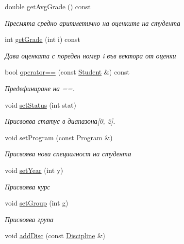 \begin{DoxyCompactItemize}
double \hyperlink{class_student_a44846b4e61b3424f590b3eae4d0c58b0}{get\+Avg\+Grade} () const
\begin{DoxyCompactList}\small\item\em Пресмята средно аритметично на оценките на студента \end{DoxyCompactList}\item 
int \hyperlink{class_student_a8dca8d440345a65b65da10319ecdf50b}{get\+Grade} (int i) const
\begin{DoxyCompactList}\small\item\em Дава оценката с пореден номер i във вектора от оценки \end{DoxyCompactList}\item 
bool \hyperlink{class_student_abb6d4d284794dfd4af8277c5dacc3911}{operator==} (const \hyperlink{class_student}{Student} \&) const
\begin{DoxyCompactList}\small\item\em Предефиниране на ==. \end{DoxyCompactList}\item 
void \hyperlink{class_student_a2d6d1de16bb99c7678f2ef8004928d18}{set\+Status} (int stat)
\begin{DoxyCompactList}\small\item\em Присвоява статус в диапазона\mbox{[}0, 2\mbox{]}. \end{DoxyCompactList}\item 
void \hyperlink{class_student_a75ce18eab05c57afd31036ffa8cea201}{set\+Program} (const \hyperlink{class_program}{Program} \&)
\begin{DoxyCompactList}\small\item\em Присвоява нова специалност на студента \end{DoxyCompactList}\item 
void \hyperlink{class_student_ac068619857e22e8a208c47314322cd11}{set\+Year} (int y)
\begin{DoxyCompactList}\small\item\em Присвоява курс \end{DoxyCompactList}\item 
void \hyperlink{class_student_a144829ea7cbfa16de9bc079365388f13}{set\+Group} (int g)
\begin{DoxyCompactList}\small\item\em Присвоява група \end{DoxyCompactList}\item 
void \hyperlink{class_student_a3cffc2aef59a99f5c0441f1bc73b090f}{add\+Disc} (const \hyperlink{class_discipline}{Discipline} \&)

\end{DoxyCompactItemize}
